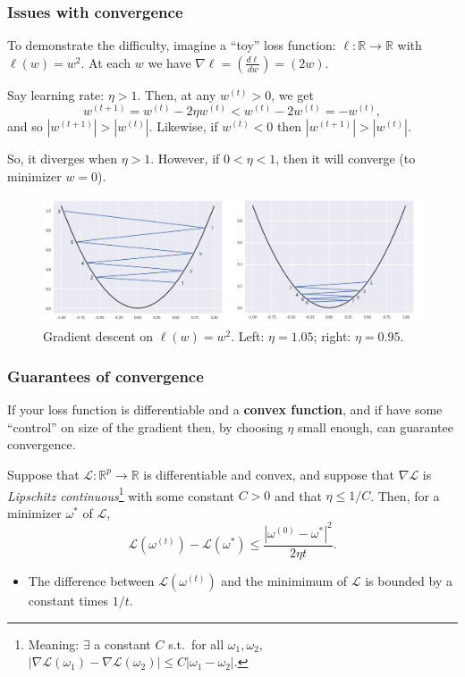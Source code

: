 \documentclass{beamer}
\theoremstyle{example}
\begin{document}
\begin{frame}
    \frametitle{Issues with convergence}
    To demonstrate the difficulty, imagine a ``toy'' loss function: $\ell:\mathbb R\to\mathbb R$ with $\ell(w) = w^2$. At each $w$ we have $\nabla\ell = \left(\frac{d\ell}{dw}\right) = (2w)$. 

    \pause
    Say learning rate: $\eta > 1$. Then, at any $w^{(t)} > 0$, we get 
        \[w^{(t+1)} = w^{(t)} - 2\eta w^{(t)} < w^{(t)} - 2w^{(t)} = -w^{(t)},\]
    and so $|w^{(t+1)}| > |w^{(t)}|$. \pause Likewise, if $w^{(t)} < 0$ then $|w^{(t+1)}| > |w^{(t)}|$.
    
    \pause
    So, it diverges when $\eta > 1$. However, if $0< \eta < 1$, then it will converge (to minimizer $w=0$).

    \pause
    \begin{figure}
    \includegraphics[height=0.3\textheight]{../../Images/GD-choosing-lr.png}
    \caption{Gradient descent on $\ell(w) = w^2$. Left: $\eta = 1.05$; right: $\eta = 0.95$.}
    \end{figure}
\end{frame}

\begin{frame}
    \frametitle{Guarantees of convergence}
    If your loss function is differentiable and a \textbf{convex function}, and if have some ``control'' on size of the gradient then, by choosing $\eta$ small enough, can guarantee convergence. 

    \pause
    \begin{theorem}Suppose that $\mathcal L:\mathbb R^p\to\mathbb R$ is differentiable and convex, and suppose that $\nabla \mathcal L$ is \textit{Lipschitz continuous}\footnote{Meaning: $\exists$ a constant $C$ s.t.\ for all $\omega_1, \omega_2$, $|\nabla\mathcal L(\omega_1) - \nabla\mathcal L(\omega_2)| \le C|\omega_1 - \omega_2|$.} with some constant $C>0$ and that $\eta \le 1/C$. Then, for a minimizer $\omega^*$ of $\mathcal L$, 
            \[\mathcal L(\omega^{(t)}) - \mathcal L(\omega^*) \le \frac{|\omega^{(0)} - \omega^*|^2}{2\eta t}.\]
    \end{theorem}
    \pause
    \begin{itemize}
        \item The difference between $\mathcal L(\omega^{(t)})$ and the minimimum of $\mathcal L$ is bounded by a constant times $1/t$.
    \end{itemize}
\end{frame}
\end{document}
